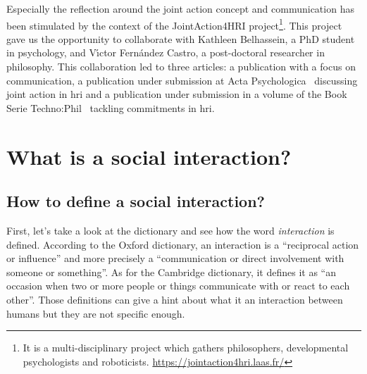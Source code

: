 \documentclass[a4paper,11pt,twoside]{StyleThese}
\begin{document}
\bigskip

Especially the reflection around the joint action concept and communication has been stimulated by the context of the JointAction4HRI project\footnote{It is a multi-disciplinary project which gathers philosophers, developmental psychologists and roboticists. \url{https://jointaction4hri.laas.fr/}}. This project gave us the opportunity to collaborate with Kathleen Belhassein, a PhD student in psychology, and V{\'\i}ctor Fern{\'a}ndez Castro, a post-doctoral researcher in philosophy. This collaboration led to three articles: a publication with a focus on communication, a publication under submission at Acta Psychologica~\citep{belhassein_2021_adressing} discussing joint action in \acrshort{hri} and a publication under submission in a volume of the Book Serie Techno:Phil~\citep{castro_2021_role} tackling commitments in \acrshort{hri}.

\section{What is a social interaction?}
\label{chap1:sec:soc_int}

\subsection{How to define a social interaction?}
First, let’s take a look at the dictionary and see how the word \emph{interaction} is defined. According to the Oxford dictionary, an interaction is a ``reciprocal action or influence'' and more precisely a ``communication or direct involvement with someone or something''. As for the Cambridge dictionary, it defines it as ``an occasion when two or more people or things communicate with or react to each other''. Those definitions can give a hint about what it an interaction between humans but they are not specific enough. 
\end{document}
